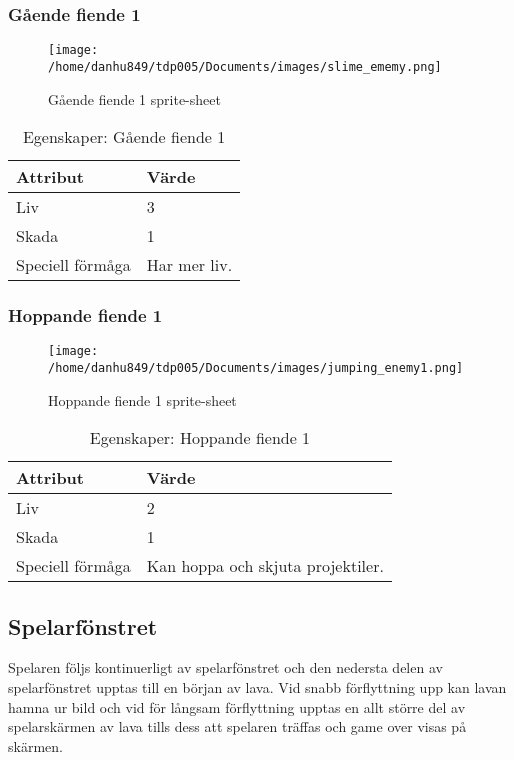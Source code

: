 \documentclass{TDP005mall}
\begin{document}
\newpage

\subsubsection*{Gående fiende 1}
\begin{figure}[h!]
  \caption{Gående fiende 1 sprite-sheet\label{fig:2}}
  \centerline{\texttt{[image: /home/danhu849/tdp005/Documents/images/slime\_ememy.png]}}
\end{figure}

\begin{table}[h!]
  \caption{Egenskaper: Gående fiende 1\label{tab:4}}
\begin{tabular}{|l|l|}
\hline
Attribut & Värde \\\hline
Liv & 3 \\\hline
Skada & 1 \\\hline
Speciell förmåga & Har mer liv. \\\hline
\end{tabular}
\end{table}


\subsubsection*{Hoppande fiende 1}
\begin{figure}[h!]
  \texttt{[image: /home/danhu849/tdp005/Documents/images/jumping\_enemy1.png]}
  \caption{Hoppande fiende 1 sprite-sheet\label{fig:3}}
\end{figure}

\begin{table}[h!]
  \caption{Egenskaper: Hoppande fiende 1\label{tab:5}}
\begin{tabular}{|l|l|}
\hline
Attribut & Värde \\\hline
Liv & 2 \\\hline
Skada & 1 \\\hline
Speciell förmåga & Kan hoppa och skjuta projektiler. \\\hline
\end{tabular}
\end{table}

\subsection{Spelarfönstret}
Spelaren följs kontinuerligt av spelarfönstret och den nedersta delen av spelarfönstret upptas till en början av lava. Vid snabb förflyttning upp kan lavan hamna ur bild och vid för långsam förflyttning upptas en allt större del av spelarskärmen av lava tills dess att spelaren träffas och game over visas på skärmen.
\end{document}
